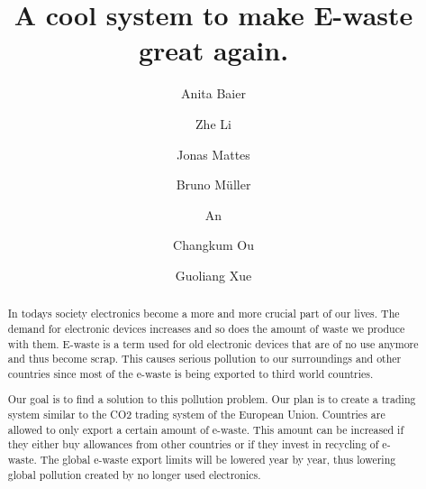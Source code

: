 \documentclass[sigchi-a, authorversion]{acmart}
\begin{document}
\title{A cool system to make E-waste great again.}

\author{Anita Baier}

\author{Zhe Li}

\author{Jonas Mattes}

\author{Bruno M\"uller}

\author{An}

\author{Changkum Ou}

\author{Guoliang Xue}



\begin{abstract}

  In todays society electronics become a more and more crucial part of our lives. 
  The demand for electronic devices increases and so does the amount of waste we produce with them. 
  E-waste is a term used for old electronic devices that are of no use anymore and thus become scrap. 
  This causes serious pollution to our surroundings and other countries since most of the e-waste is 
  being exported to third world countries.
  
  Our goal is to find a solution to this pollution problem. Our plan is to create a trading system similar 
  to the CO2 trading system of the European Union. Countries are allowed to only export a certain amount of e-waste. 
  This amount can be increased if they either buy allowances from other countries or if they invest in recycling of e-waste. 
  The global e-waste export limits will be lowered year by year, thus lowering global pollution created by no longer
  used electronics.  
  
\end{abstract}
\end{document}
